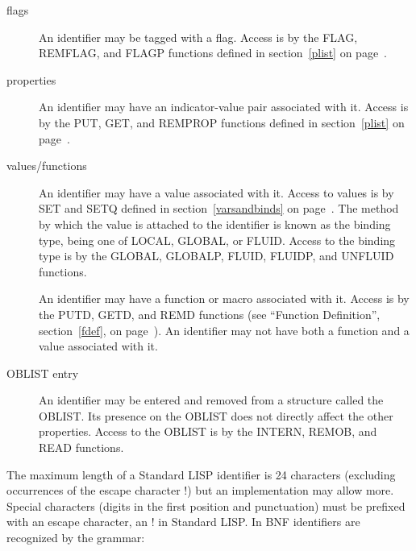 \begin{description}
\begin{description}
\item[flags] An identifier may be tagged with a flag. Access is by the
FLAG, REMFLAG, and FLAGP functions defined in section~\ref{plist} on
page~\pageref{plist}.   

\item[properties]  An identifier may have an
indicator-value pair associated with it. Access is by the PUT, GET,
and REMPROP functions defined in section~\ref{plist} on
page~\pageref{plist}.
  

\item[values/functions] An identifier may have a value associated with
  it. Access to values is by SET and SETQ
defined in   section~\ref{varsandbinds} on
page~\pageref{varsandbinds}. The method by which the value is attached
to the identifier is known as the binding type, being one of LOCAL,
GLOBAL, or FLUID. Access to the binding type is by the GLOBAL,
GLOBALP, FLUID, FLUIDP, and UNFLUID functions.
    

An identifier may have a function or macro associated with it. Access
is by the PUTD, GETD, and REMD functions (see ``Function Definition'',
section~\ref{fdef}, on page~\pageref{fdef}).  
 An identifier may not have both a function and a value
associated with it.

\item[OBLIST entry]  An identifier may be entered and
removed from a structure called the OBLIST. Its presence on the OBLIST
does not directly affect the other properties. Access to the OBLIST is
by the INTERN, REMOB, and READ functions.  
\end{description}

The maximum length of a Standard LISP identifier is 24 characters
(excluding occurrences of the escape character !) but an
implementation may allow more. Special characters (digits in the first
position and punctuation) must be prefixed with an escape character,
an ! in Standard LISP. In BNF identifiers are recognized by the
grammar:



\end{description}
